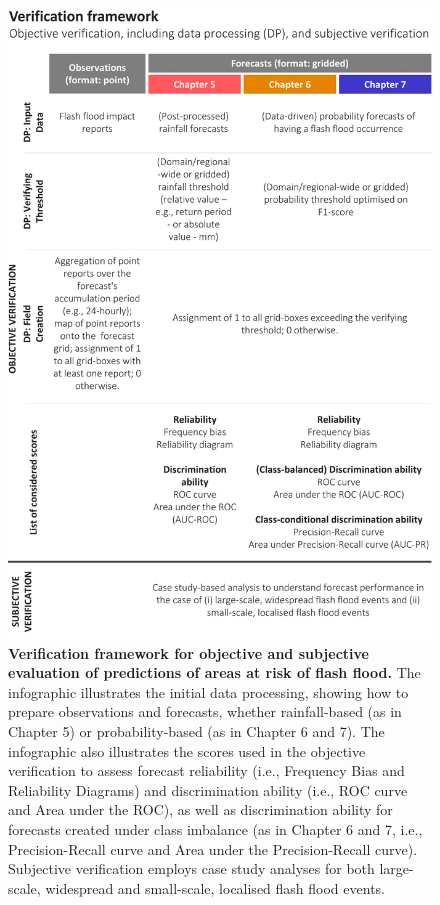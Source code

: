 \begin{figure}[htbp]
\centering
\includegraphics[width=\textwidth]{forecast_evaluation_strategy.png}
\caption{\textbf{Verification framework for objective and subjective evaluation of predictions of areas at risk of flash flood.} The infographic illustrates the initial data processing, showing how to prepare observations and forecasts, whether rainfall-based (as in Chapter 5) or probability-based (as in Chapter 6 and 7). The infographic also illustrates the scores used in the objective verification to assess forecast reliability (i.e., Frequency Bias and Reliability Diagrams) and discrimination ability (i.e., ROC curve and Area under the ROC), as well as discrimination ability for forecasts created under class imbalance (as in Chapter 6 and 7, i.e., Precision-Recall curve and Area under the Precision-Recall curve). Subjective verification employs case study analyses for both large-scale, widespread and small-scale, localised flash flood events.}
\label{fig:forecast_evaluatio_strategy}
\end{figure}

